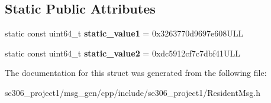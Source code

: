 \subsection*{Static Public Attributes}
\begin{DoxyCompactItemize}
\item 
\hypertarget{structros_1_1message__traits_1_1MD5Sum_3_01_1_1se306__project1_1_1ResidentMsg___3_01ContainerAllocator_01_4_01_4_a37972fc33e3a5f7f44d6e783d452d689}{static const uint64\-\_\-t {\bfseries static\-\_\-value1} = 0x3263770d9697e608\-U\-L\-L}\label{structros_1_1message__traits_1_1MD5Sum_3_01_1_1se306__project1_1_1ResidentMsg___3_01ContainerAllocator_01_4_01_4_a37972fc33e3a5f7f44d6e783d452d689}

\item 
\hypertarget{structros_1_1message__traits_1_1MD5Sum_3_01_1_1se306__project1_1_1ResidentMsg___3_01ContainerAllocator_01_4_01_4_a83dba0321612123fae5b2a20ccaa2aee}{static const uint64\-\_\-t {\bfseries static\-\_\-value2} = 0xdc5912cf7c7dbf41\-U\-L\-L}\label{structros_1_1message__traits_1_1MD5Sum_3_01_1_1se306__project1_1_1ResidentMsg___3_01ContainerAllocator_01_4_01_4_a83dba0321612123fae5b2a20ccaa2aee}

\end{DoxyCompactItemize}


The documentation for this struct was generated from the following file\-:\begin{DoxyCompactItemize}
\item 
se306\-\_\-project1/msg\-\_\-gen/cpp/include/se306\-\_\-project1/Resident\-Msg.\-h\end{DoxyCompactItemize}
